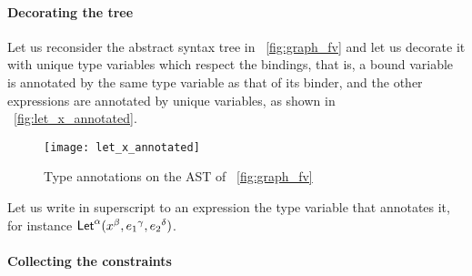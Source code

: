 \paragraph{Decorating the tree}

Let us reconsider the abstract syntax tree in \fig~\vref{fig:graph_fv}
and let us decorate it with unique type variables which respect the
bindings, that is, a bound variable is annotated by the same type
variable as that of its binder, and the other expressions are
annotated by unique variables, as shown in
\fig~\vref{fig:let_x_annotated}.
\begin{figure}
\centering
\texttt{[image: let\_x\_annotated]}
\caption{Type annotations on the AST of \fig~\vref{fig:graph_fv}
\label{fig:let_x_annotated}}
\end{figure}
Let us write in superscript to an expression the type variable that
annotates it, for instance ${\textsf{Let}}^{\alpha}({x}^{\beta},
{e_1}^{\gamma}, {e_2}^{\delta})$.

\paragraph{Collecting the constraints}

